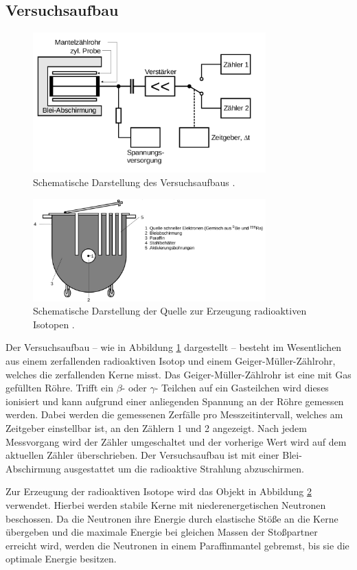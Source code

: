 \subsection{Versuchsaufbau}
\label{sec:Versuchsaufbau}
\begin{figure}
	\centering
	\includegraphics[width=0.8\textwidth]{Bilder/aufbau.png}
	\caption{Schematische Darstellung des Versuchsaufbaus \cite{Anleitung}.}
	\label{fig:aufbau}
\end{figure}

\begin{figure}
	\centering
	\includegraphics[width=0.8\textwidth]{Bilder/toepfchen.png}%
	\caption{Schematische Darstellung der Quelle zur Erzeugung radioaktiven Isotopen \cite{Anleitung}.}
	\label{fig:kochen}
\end{figure}

Der Versuchsaufbau -- wie in Abbildung \ref{fig:aufbau} dargestellt -- besteht im Wesentlichen
aus einem zerfallenden radioaktiven Isotop und einem Geiger-Müller-Zählrohr, welches die
zerfallenden Kerne misst.
Das Geiger-Müller-Zählrohr ist eine mit Gas gefüllten Röhre. Trifft ein $\beta$-
oder $\gamma$- Teilchen auf ein Gasteilchen wird dieses ionisiert und kann aufgrund einer
anliegenden Spannung an der Röhre gemessen werden.
Dabei werden die gemessenen Zerfälle pro Messzeitintervall, welches am Zeitgeber einstellbar
ist, an den Zählern 1 und 2 angezeigt. Nach jedem Messvorgang wird der Zähler umgeschaltet und
der vorherige Wert wird auf dem aktuellen Zähler überschrieben. Der Versuchsaufbau ist mit
einer Blei-Abschirmung ausgestattet um die radioaktive Strahlung abzuschirmen.

Zur Erzeugung der radioaktiven Isotope wird das Objekt in Abbildung \ref{fig:kochen} verwendet.
Hierbei werden stabile Kerne mit niederenergetischen Neutronen beschossen.
Da die Neutronen ihre Energie durch elastische Stöße an die Kerne übergeben und die maximale
Energie bei gleichen Massen der Stoßpartner erreicht wird, werden die Neutronen in einem
Paraffinmantel gebremst, bis sie die optimale Energie besitzen.
